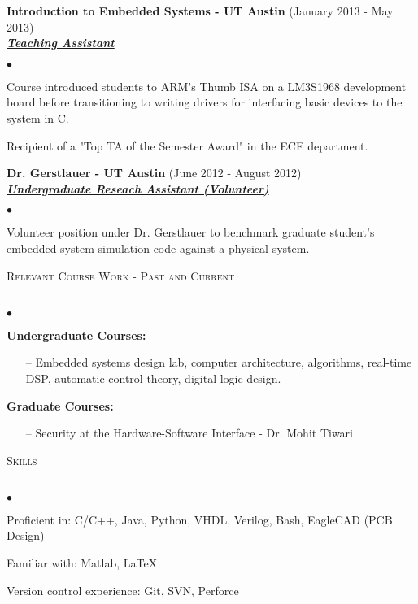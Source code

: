 \documentclass[11pt]{article}
\newcommand{\lineunder}{\vspace*{-8pt} \\ \hspace*{-18pt} \hrulefill \\}
\newcommand{\header}[1]{{\hspace*{-10pt}\vspace*{6pt} \textsc{#1}} \vspace*{-6pt} \lineunder}
\newcommand{\employer}[3]{{ \textbf{#1} (#2)\\ \underline{\textbf{\emph{#3}}}\\  }}
\newenvironment{achievements}{\begin{list}{$\bullet$}{\topsep 0pt \itemsep -2pt}}{\vspace*{4pt}\end{list}}
\begin{document}
\employer{Introduction to Embedded Systems - UT Austin}{January 2013 - May 2013} {Teaching Assistant}
	\begin{achievements}
	\item Course introduced students to ARM’s Thumb ISA on a LM3S1968 development board before transitioning to writing drivers for interfacing basic devices to the system in C.
	\item Recipient of a "Top TA of the Semester Award" in the ECE department.
	\end{achievements}

\employer{Dr. Gerstlauer - UT Austin}{June 2012 - August 2012}{Undergraduate Reseach Assistant (Volunteer)}
	\begin{achievements}
	\item Volunteer position under Dr. Gerstlauer to benchmark graduate student’s embedded system simulation code against a physical system.
	\end{achievements}

\header{Relevant Course Work - Past and Current}
	\begin{achievements}
    \item \textbf{Undergraduate Courses:}
    	\begin{enumerate}
        	\item[--] Embedded systems design lab, computer architecture,  algorithms, real-time DSP, automatic control theory, digital logic design.
        \end{enumerate}
        
    \item \textbf{Graduate Courses:} 
        \begin{enumerate}
        	\item[--] Security at the Hardware-Software Interface - Dr. Mohit Tiwari
        \end{enumerate}
    \end{achievements}

\header{Skills}
\begin{achievements}
	\item Proficient in: C/C++, Java, Python, VHDL, Verilog, Bash, EagleCAD (PCB Design)
    \item Familiar with: Matlab, \LaTeX
    \item Version control experience: Git, SVN, Perforce
\end{achievements}
\end{document}
